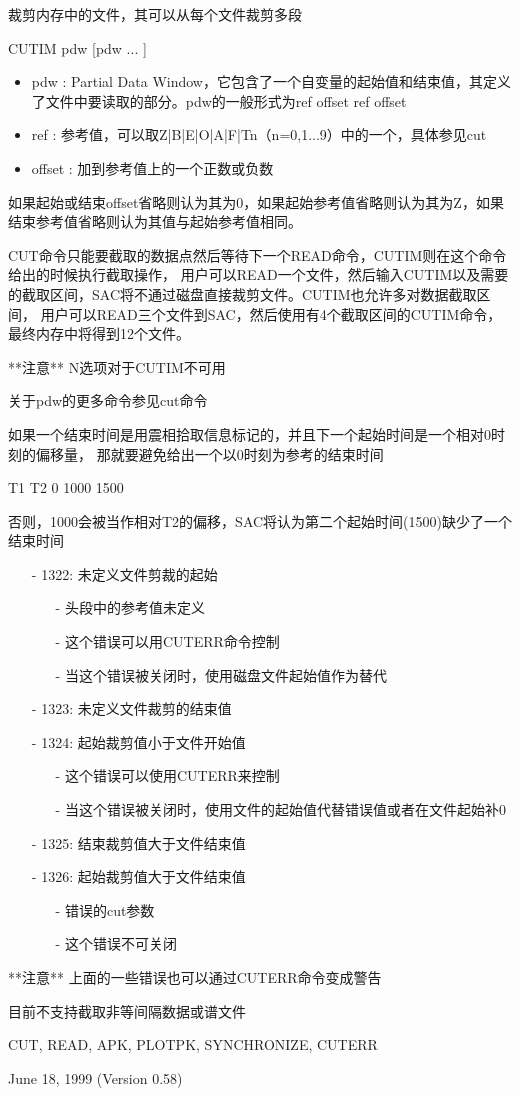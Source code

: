 \label{cmd:cutim}

裁剪内存中的文件，其可以从每个文件裁剪多段

CUTIM pdw [pdw ... ]

\begin{itemize}
\item pdw : Partial Data Window，它包含了一个自变量的起始值和结束值，其定义了文件中要读取的部分。pdw的一般形式为ref offset ref offset
\item ref : 参考值，可以取Z|B|E|O|A|F|Tn（n=0,1...9）中的一个，具体参见cut
\item offset : 加到参考值上的一个正数或负数 
\end{itemize}

如果起始或结束offset省略则认为其为0，如果起始参考值省略则认为其为Z，如果结束参考值省略则认为其值与起始参考值相同。

CUT命令只能要截取的数据点然后等待下一个READ命令，CUTIM则在这个命令给出的时候执行截取操作，
用户可以READ一个文件，然后输入CUTIM以及需要的截取区间，SAC将不通过磁盘直接裁剪文件。CUTIM也允许多对数据截取区间，
用户可以READ三个文件到SAC，然后使用有4个截取区间的CUTIM命令，最终内存中将得到12个文件。

**注意**  N选项对于CUTIM不可用

关于pdw的更多命令参见cut命令

如果一个结束时间是用震相拾取信息标记的，并且下一个起始时间是一个相对0时刻的偏移量，
那就要避免给出一个以0时刻为参考的结束时间

T1 T2 0 1000 1500

否则，1000会被当作相对T2的偏移，SAC将认为第二个起始时间(1500)缺少了一个	结束时间

\begin{itemize}
\item[-]1322: 未定义文件剪裁的起始
	\begin{itemize}
	\item[-]头段中的参考值未定义
	\item[-]这个错误可以用CUTERR命令控制
	\item[-]当这个错误被关闭时，使用磁盘文件起始值作为替代
	\end{itemize}
\item[-]1323: 未定义文件裁剪的结束值
\item[-]1324: 起始裁剪值小于文件开始值
	\begin{itemize}
	\item[-]这个错误可以使用CUTERR来控制
	\item[-]当这个错误被关闭时，使用文件的起始值代替错误值或者在文件起始补0
	\end{itemize}
\item[-]1325: 结束裁剪值大于文件结束值
\item[-]1326: 起始裁剪值大于文件结束值
	\begin{itemize}
	\item[-]错误的cut参数
	\item[-]这个错误不可关闭
	\end{itemize}
\end{itemize}

**注意** 上面的一些错误也可以通过CUTERR命令变成警告

目前不支持截取非等间隔数据或谱文件

CUT, READ, APK, PLOTPK, SYNCHRONIZE, CUTERR

June 18, 1999 (Version 0.58)
